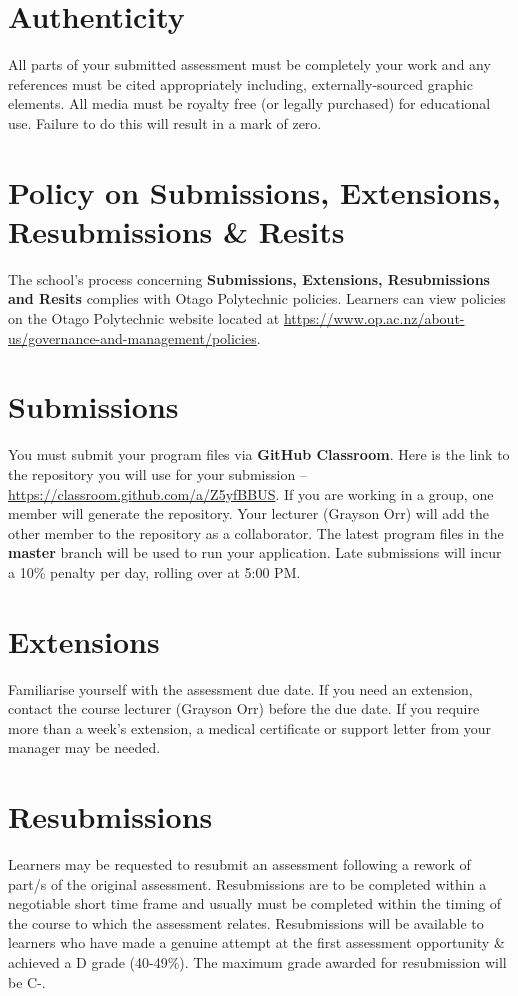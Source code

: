 \documentclass{article}
\begin{document}
\section*{Authenticity}
All parts of your submitted assessment must be completely your work and any references must be cited appropriately including, externally-sourced graphic elements. All media must be royalty free (or legally purchased) for educational use. Failure to do this will result in a mark of zero.

\section*{Policy on Submissions, Extensions, Resubmissions \& Resits}
The school's process concerning \textbf{Submissions, Extensions, Resubmissions and Resits} complies with Otago Polytechnic policies. Learners can view policies on the Otago Polytechnic website located at \href{https://www.op.ac.nz/about-us/governance-and-management/policies}{https://www.op.ac.nz/about-us/governance-and-management/policies}.

\section*{Submissions}
You must submit your program files via \textbf{GitHub Classroom}. Here is the link to the repository you will use for your submission – \href{https://classroom.github.com/a/Z5yfBBUS}{https://classroom.github.com/a/Z5yfBBUS}. If you are working in a group, one member will generate the repository. Your lecturer (Grayson Orr) will add the other member to the repository as a collaborator. The latest program files in the \textbf{master} branch will be used to run your application. Late submissions will incur a 10\% penalty per day, rolling over at 5:00 PM.

\section*{Extensions}
Familiarise yourself with the assessment due date. If you need an extension, contact the course lecturer (Grayson Orr) before the due date. If you require more than a week's extension, a medical certificate or support letter from your manager may be needed.

\section*{Resubmissions}
Learners may be requested to resubmit an assessment following a rework of part/s of the original assessment. Resubmissions are to be completed within a negotiable short time frame and usually must be completed within the timing of the course to which the assessment relates. Resubmissions will be available to learners who have made a genuine attempt at the first assessment opportunity \& achieved a D grade (40-49\%). The maximum grade awarded for resubmission will be C-.
\end{document}
